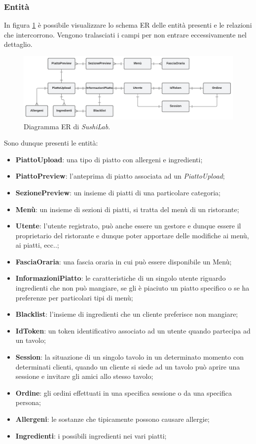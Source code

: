 \subsubsection{Entità}
In figura \ref{ER-sushilab} è possibile visualizzare lo schema ER delle entità presenti e le relazioni che intercorrono. Vengono tralasciati i campi per non entrare eccessivamente nel dettaglio.
\FloatBarrier
\begin{figure}[!ht]
\centering
\includegraphics[width=1\linewidth]{immagini/ER_sushilab.pdf}
\caption{Diagramma ER di \textit{SushiLab}.}
\label{ER-sushilab}
\end{figure}
\FloatBarrier
Sono dunque presenti le entità:
\begin{itemize}
  \item \textbf{PiattoUpload}: una tipo di piatto con allergeni e ingredienti;
  \item \textbf{PiattoPreview}: l'anteprima di piatto associata ad un \textit{PiattoUpload};
  \item \textbf{SezionePreview}: un insieme di piatti di una particolare categoria;
  \item \textbf{Menù}: un insieme di sezioni di piatti, si tratta del menù di un ristorante;
  \item \textbf{Utente}: l'utente registrato, può anche essere un gestore e dunque essere il proprietario del ristorante e dunque poter apportare delle modifiche ai menù, ai piatti, ecc..;
  \item \textbf{FasciaOraria}: una fascia oraria in cui può essere disponibile un Menù;
  \item \textbf{InformazioniPiatto}: le caratteristiche di un singolo utente riguardo ingredienti che non può mangiare, se gli è piaciuto un piatto specifico o se ha preferenze per particolari tipi di menù;
  \item \textbf{Blacklist}: l'insieme di ingredienti che un cliente preferisce non mangiare;
  \item \textbf{IdToken}: un token identificativo associato ad un utente quando partecipa ad un tavolo;
  \item \textbf{Session}: la situazione di un singolo tavolo in un determinato momento con determinati clienti, quando un cliente si siede ad un tavolo può aprire una sessione e invitare gli amici allo stesso tavolo;
  \item \textbf{Ordine}: gli ordini effettuati in una specifica sessione o da una specifica persona;
  \item \textbf{Allergeni}: le sostanze che tipicamente possono causare allergie;
  \item \textbf{Ingredienti}: i possibili ingredienti nei vari piatti;
\end{itemize}
